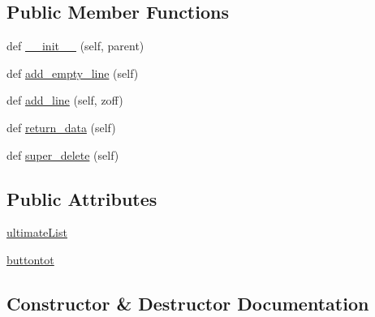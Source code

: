 \subsection*{Public Member Functions}
\begin{DoxyCompactItemize}
\item 
def \hyperlink{class_uni_dec_1_1unidec__modules_1_1nativez_1_1_color_list_adac31bf7b03956b7f7fbe8401402ca8e}{\+\_\+\+\_\+init\+\_\+\+\_\+} (self, parent)
\item 
def \hyperlink{class_uni_dec_1_1unidec__modules_1_1nativez_1_1_color_list_ae18b151e90986826c2d52e17e8d22d62}{add\+\_\+empty\+\_\+line} (self)
\item 
def \hyperlink{class_uni_dec_1_1unidec__modules_1_1nativez_1_1_color_list_a1936e3f40b5b37d4ca83eff4af43c7b1}{add\+\_\+line} (self, zoff)
\item 
def \hyperlink{class_uni_dec_1_1unidec__modules_1_1nativez_1_1_color_list_a35107ea085d1744601b04d7c293f1785}{return\+\_\+data} (self)
\item 
def \hyperlink{class_uni_dec_1_1unidec__modules_1_1nativez_1_1_color_list_a38e834c7b5a45df6c1c87fd63ecb72a7}{super\+\_\+delete} (self)
\end{DoxyCompactItemize}
\subsection*{Public Attributes}
\begin{DoxyCompactItemize}
\item 
\hyperlink{class_uni_dec_1_1unidec__modules_1_1nativez_1_1_color_list_a92dd7a67dff33698f6977aa973b61fdd}{ultimate\+List}
\item 
\hyperlink{class_uni_dec_1_1unidec__modules_1_1nativez_1_1_color_list_a94a55aaee0c75c2e984d44ee33834ae8}{buttontot}
\end{DoxyCompactItemize}


\subsection{Constructor \& Destructor Documentation}
\hypertarget{class_uni_dec_1_1unidec__modules_1_1nativez_1_1_color_list_adac31bf7b03956b7f7fbe8401402ca8e}{}
